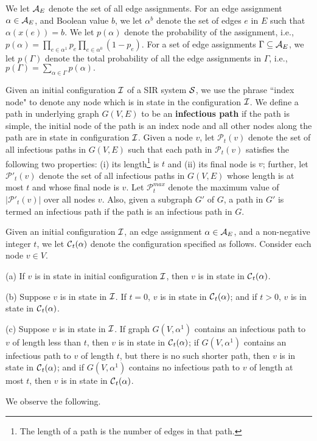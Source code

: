 We let ${\cal A}_E$ denote the set of all edge assignments.
For an edge assignment $\alpha \in {\cal A}_E$, 
and Boolean value $b$, we let $\alpha^b$ denote the set of edges $e$ in $E$
such that $\alpha(x(e)) = b$.
We let $p(\alpha)$ denote the probability of the assignment, i.e.,
$p(\alpha) = \displaystyle{ \prod_{e \in \alpha^1} p_e 
 \prod_{e \in \alpha^0} (1 - p_e)   }.$      
 For a set of edge assignments $\Gamma \subseteq {\cal A}_E$,
 we let $p(\Gamma)$ denote the total probability 
 of all the edge assignments in $\Gamma$, 
 i.e., 
 $p(\Gamma) = \displaystyle{ \sum_{\alpha \in \Gamma} p(\alpha) 
                                            }.$     

Given an initial configuration $\mbox{${\cal I}$}{}$ of a SIR system $\mbox{${\cal S}$}{}$,
we use the phrase ``index node" to denote any
node which is in state \istate{} in the configuration $\mbox{${\cal I}$}{}$.  
We define a path in underlying graph $G(V,E)$ 
to be an {\bf infectious path} if the path is simple,
the initial node of the path is an index node
and all other nodes along the path 
are in state \sstate{} in configuration $\mbox{${\cal I}$}{}$.
Given a node $v$,
let $\mathcal{P}_t(v)$ denote the set of all infectious paths in $G(V, E)$
such that each path in $\mathcal{P}_t(v)$ satisfies the following
two properties: (i) its length\footnote{The length 
of a path is the number of edges in that path.} is
$t$ and (ii) its final node is $v$;
further, let $\mathcal{P}'_t(v)$ denote the set of 
all infectious paths in $G(V, E)$
whose length is at most $t$ and whose final node is $v$.
Let $\mathcal{P}_t^{max}$ denote 
the maximum value of $|\mathcal{P}'_t(v)|$ over all nodes $v$.
Also, given a subgraph $G'$ of $G$, a path in $G'$ is termed an infectious path
if the path is an infectious path in $G$.

Given an initial configuration $\mbox{${\cal I}$}{}$,
an edge assignment $\alpha \in {\cal A}_E$, 
and a non-negative integer $t$,
we let $\mbox{${\cal C}$}{}_t(\alpha)$ denote the configuration specified as follows.
Consider each node $v \in V$.
\begin{description}
\item{(a)}
If $v$ is in state \rstate{} in initial configuration $\mbox{${\cal I}$}{}$,
then $v$ is in state \rstate{} in $\mbox{${\cal C}$}{}_t(\alpha)$.
\item{(b)}
Suppose $v$ is in state \istate{} in $\mbox{${\cal I}$}{}$.
If $t=0$,
$v$ is in state \istate{} in $\mbox{${\cal C}$}{}_t(\alpha)$;
and if $t >0$,
$v$ is in state \rstate{} in $\mbox{${\cal C}$}{}_t(\alpha)$.
\item{(c)}
Suppose $v$ is in state \sstate{} in $\mbox{${\cal I}$}{}$.
If graph $G(V, \alpha^1)$ contains an infectious path to $v$ of length less than $t$,
then $v$ is in state \rstate{} in $\mbox{${\cal C}$}{}_t(\alpha)$;
if $G(V, \alpha^1)$ contains an infectious path to $v$ of length $t$,
but there is no such shorter path, 
then $v$ is in state \istate{} in $\mbox{${\cal C}$}{}_t(\alpha)$;
and if $G(V, \alpha^1)$ contains no infectious path to $v$ of length at most $t$,
then $v$ is in state \sstate{} in $\mbox{${\cal C}$}{}_t(\alpha)$.
\end{description}
We observe the following.

